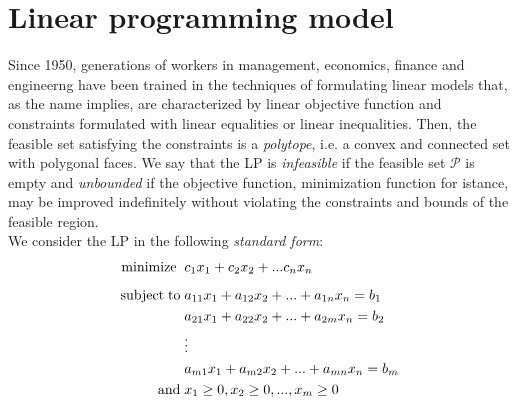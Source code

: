 \documentclass[a4paper,10 pt,titlepage,twoside]{book}
\theoremstyle{plain}
\theoremstyle{definition}
\theoremstyle{remark}
\begin{document}
\section{Linear programming model}

Since 1950, generations of workers in management, economics, finance and engineerng have been trained in the techniques of formulating linear models that,
as the name implies, are characterized by linear objective function and constraints formulated with linear equalities or linear inequalities.
Then, the feasible set satisfying the constraints is a \textit{polytope}, i.e. a convex and connected set with polygonal faces. We say that the LP is \textit{infeasible} if the feasible set $\mathcal{P}$ is empty and \textit{unbounded} if the objective function, minimization function for istance, may be improved indefinitely without violating the constraints and bounds of the feasible region.\\
We consider the LP in the following \textit{standard form}:
\begin{alignat*}{1}\label{eq:stdform}
\text{minimize\;}\; &c_1 x_1 + c_2 x_2+ ... c_n x_n\\[1.8mm]
\text{subject\;to\;} &a_{11} x_1 + a_{12} x_2+ ... +a_{1n}x_n = b_1\\
&a_{21} x_1 + a_{22} x_2 + ... + a_{2m} x_n= b_2\\
&\vdots\\
&a_{m1} x_1 + a_{m2} x_2 + ... + a_{mn} x_n= b_m\\
\text{and}\; & x_1 \geq 0 , x_2 \geq 0, ... , x_m \geq 0
 \end{alignat*}
\end{document}
